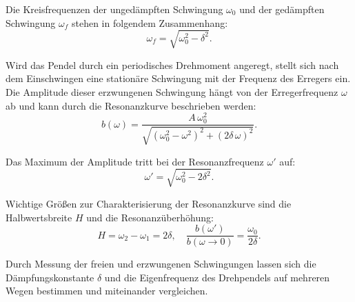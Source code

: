 Die Kreisfrequenzen der ungedämpften Schwingung $\omega_0$ und der gedämpften Schwingung $\omega_f$ stehen in folgendem Zusammenhang:
\begin{equation}
\omega_f = \sqrt{\omega_0^2 - \delta^2}.
\end{equation}

Wird das Pendel durch ein periodisches Drehmoment angeregt, stellt sich nach dem Einschwingen eine stationäre Schwingung mit der Frequenz des Erregers ein. Die Amplitude dieser erzwungenen Schwingung hängt von der Erregerfrequenz $\omega$ ab und kann durch die Resonanzkurve beschrieben werden:
\begin{equation}
b(\omega) = \frac{A \, \omega_0^2}{\sqrt{(\omega_0^2 - \omega^2)^2 + (2 \delta \, \omega)^2}}.
\end{equation}

Das Maximum der Amplitude tritt bei der Resonanzfrequenz $\omega'$ auf:
\begin{equation}
\omega' = \sqrt{\omega_0^2 - 2 \delta^2}.
\end{equation}

Wichtige Größen zur Charakterisierung der Resonanzkurve sind die Halbwertsbreite $H$ und die Resonanzüberhöhung:
\begin{equation}
H = \omega_2 - \omega_1 = 2 \delta, \quad \frac{b(\omega')}{b(\omega \to 0)} = \frac{\omega_0}{2 \delta}.
\end{equation}

Durch Messung der freien und erzwungenen Schwingungen lassen sich die Dämpfungskonstante $\delta$ und die Eigenfrequenz des Drehpendels auf mehreren Wegen bestimmen und miteinander vergleichen.
